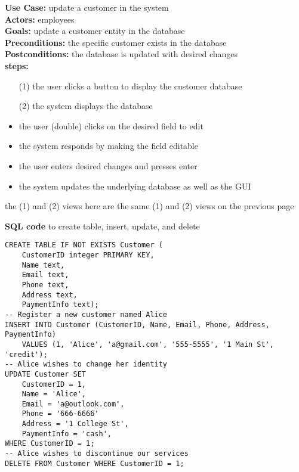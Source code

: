 \documentclass[notitlepage,11pt]{article}
\begin{document}
\newpage
\textbf{Use Case:} update a customer in the system\\
\textbf{Actors:} employees\\
\textbf{Goals:} update a customer entity in the database\\
\textbf{Preconditions:} the specific customer exists in the database\\
\textbf{Postconditions:} the database is updated with desired changes\\
\textbf{steps:}
	\begin{itemize}
		\item[(1)] the user clicks a button to display the customer database
		\item[(2)] the system displays the database
		\item the user (double) clicks on the desired field to edit
		\item the system responds by making the field editable
		\item the user enters desired changes and presses enter
		\item the system updates the underlying database as well as the GUI
	\end{itemize}
the (1) and (2) views here are the same (1) and (2) views on the previous page

\textbf{SQL code} to create table, insert, update, and delete
\begin{lstlisting}
CREATE TABLE IF NOT EXISTS Customer (
	CustomerID integer PRIMARY KEY,
	Name text,
	Email text,
	Phone text,
	Address text,
	PaymentInfo text);
-- Register a new customer named Alice
INSERT INTO Customer (CustomerID, Name, Email, Phone, Address, PaymentInfo)
	VALUES (1, 'Alice', 'a@gmail.com', '555-5555', '1 Main St', 'credit');
-- Alice wishes to change her identity
UPDATE Customer SET 
	CustomerID = 1,
	Name = 'Alice',
	Email = 'a@outlook.com',
	Phone = '666-6666'
	Address = '1 College St',
	PaymentInfo = 'cash',
WHERE CustomerID = 1;
-- Alice wishes to discontinue our services
DELETE FROM Customer WHERE CustomerID = 1;
\end{lstlisting}
\newpage
\end{document}
